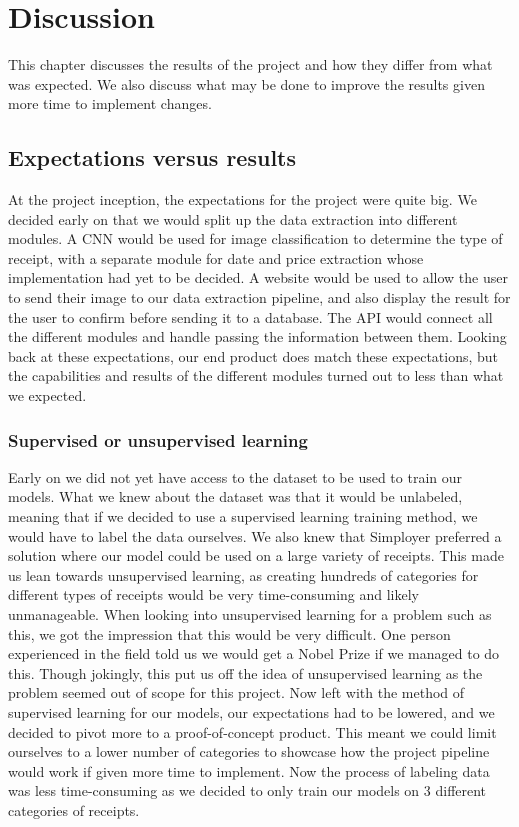 \chapter{Discussion}
\label{ch:discussion}
This chapter discusses the results of the project and how they differ from what was expected.
We also discuss what may be done to improve the results given more time to implement changes.

\section{Expectations versus results}\label{sec:expectations-versus-results}
At the project inception, the expectations for the project were quite big.
We decided early on that we would split up the data extraction into different modules.
A CNN would be used for image classification to determine the type of receipt, with a separate module for date and price extraction whose implementation had yet to be decided.
A website would be used to allow the user to send their image to our data extraction pipeline, and also display the result for the user to confirm before sending it to a database.
The API would connect all the different modules and handle passing the information between them.
Looking back at these expectations, our end product does match these expectations, but the capabilities and results of the different modules turned out to less than what we expected.

\subsection{Supervised or unsupervised learning}\label{subsec:supervised-or-unsupervised-learning}
Early on we did not yet have access to the dataset to be used to train our models.
What we knew about the dataset was that it would be unlabeled, meaning that if we decided to use a supervised learning training method, we would have to label the data ourselves.
We also knew that Simployer preferred a solution where our model could be used on a large variety of receipts.
This made us lean towards unsupervised learning, as creating hundreds of categories for different types of receipts would be very time-consuming and likely unmanageable.
When looking into unsupervised learning for a problem such as this, we got the impression that this would be very difficult.
One person experienced in the field told us we would get a Nobel Prize if we managed to do this.
Though jokingly, this put us off the idea of unsupervised learning as the problem seemed out of scope for this project.
Now left with the method of supervised learning for our models, our expectations had to be lowered, and we decided to pivot more to a proof-of-concept product.
This meant we could limit ourselves to a lower number of categories to showcase how the project pipeline would work if given more time to implement.
Now the process of labeling data was less time-consuming as we decided to only train our models on 3 different categories of receipts.

